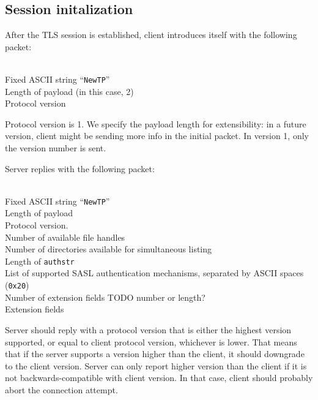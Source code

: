 %

\subsection{Session initalization}

\begin{samepage}
After the TLS session is established, client introduces itself with the following packet:
\begin{description}[parsep=1pt]
	 \hfill \\
		Fixed ASCII string ``{\tt NewTP}''
	 \hfill \\
		Length of payload (in this case, 2)
	 \hfill \\
		Protocol version
\end{description}

Protocol version is 1. We specify the payload length for extensibility: in a future version, client might be
sending more info in the initial packet. In version 1, only the version number is sent.
\end{samepage}

\begin{samepage}
Server replies with the following packet:
\begin{description}[parsep=1pt]
	 \hfill \\
		Fixed ASCII string ``{\tt NewTP}''
	 \hfill \\
		Length of payload
	 \hfill \\
		Protocol version.
	 \hfill \\
		Number of available file handles
	 \hfill \\
		Number of directories available for simultaneous listing
	 \hfill \\
		Length of {\tt authstr}
	 \hfill \\
		List of supported SASL authentication mechanisms, separated by ASCII spaces ({\tt 0x20})
	 \hfill \\
		Number of extension fields TODO number or length?
	 \hfill \\
		Extension fields
\end{description}
\end{samepage}

Server should reply with a protocol version that is either the highest version supported, or equal to client
protocol version, whichever is lower. That means that if the server supports a version higher than the client,
it should downgrade to the client version. Server can only report higher version than the client if it is not
backwards-compatible with client version. In that case, client should probably abort the connection attempt.

